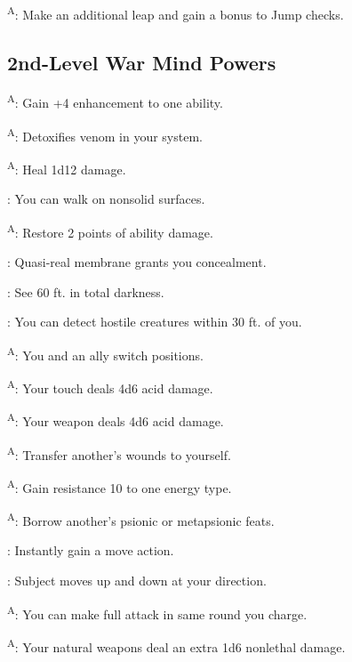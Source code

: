 \textsuperscript{A}: Make an additional leap and gain a bonus to Jump checks. %




\subsection{2nd-Level War Mind Powers}

\textsuperscript{A}: Gain +4 enhancement to one ability.

\textsuperscript{A}: Detoxifies venom in your system. %

\textsuperscript{A}: Heal 1d12 damage.

: You can walk on nonsolid surfaces.

\textsuperscript{A}: Restore 2 points of ability damage.

: Quasi-real membrane grants you concealment.

: See 60 ft. in total darkness.

: You can detect hostile creatures within 30 ft. of you.

\textsuperscript{A}: You and an ally switch positions.

\textsuperscript{A}: Your touch deals 4d6 acid damage.

\textsuperscript{A}: Your weapon deals 4d6 acid damage.

\textsuperscript{A}: Transfer another's wounds to yourself.

\textsuperscript{A}: Gain resistance 10 to one energy type.

\textsuperscript{A}: Borrow another's psionic or metapsionic feats.

: Instantly gain a move action.

: Subject moves up and down at your direction.

\textsuperscript{A}: You can make full attack in same round you charge.

\textsuperscript{A}: Your natural weapons deal an extra 1d6 nonlethal damage.

